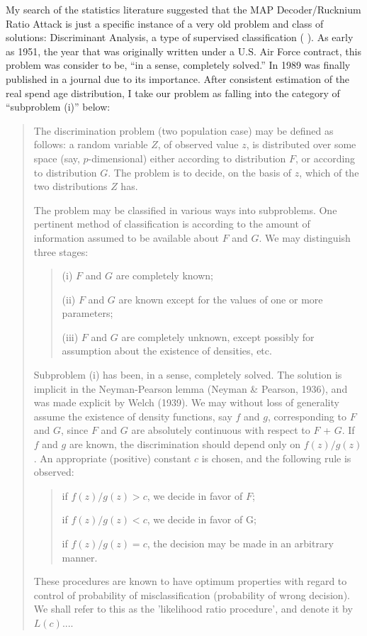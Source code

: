 \documentclass[english]{article}
\begin{document}
My search of the statistics literature suggested that the MAP Decoder/Rucknium
Ratio Attack is just a specific instance of a very old problem and
class of solutions: Discriminant Analysis, a type of supervised classification
(\cite{mclachlan1992discriminant} \cite{FraleyRaftery2002}). As
early as 1951, the year that \cite{FixHodges1989} was originally
written under a U.S. Air Force contract, this problem was consider
to be, ``in a sense, completely solved.'' In 1989 \cite{FixHodges1989}
was finally published in a journal due to its importance. After consistent
estimation of the real spend age distribution, I take our problem
as falling into the category of ``subproblem (i)'' below:
\begin{quote}
The discrimination problem (two population case) may be defined as
follows: a random variable $Z$, of observed value $z$, is distributed
over some space (say, $p$-dimensional) either according to distribution
$F$, or according to distribution $G$. The problem is to decide,
on the basis of $z$, which of the two distributions $Z$ has.

The problem may be classified in various ways into subproblems. One
pertinent method of classification is according to the amount of information
assumed to be available about $F$ and $G$. We may distinguish three
stages:
\begin{quote}
(i) $F$ and $G$ are completely known;

(ii) $F$ and $G$ are known except for the values of one or more
parameters;

(iii) $F$ and $G$ are completely unknown, except possibly for assumption
about the existence of densities, etc.
\end{quote}
Subproblem (i) has been, in a sense, completely solved. The solution
is implicit in the Neyman-Pearson lemma (Neyman \& Pearson, 1936),
and was made explicit by Welch (1939). We may without loss of generality
assume the existence of density functions, say $f$ and $g$, corresponding
to $F$ and $G$, since $F$ and $G$ are absolutely continuous with
respect to $F$ + $G$. If $f$ and $g$ are known, the discrimination
should depend only on $f(z)/g(z)$. An appropriate (positive) constant
$c$ is chosen, and the following rule is observed:
\begin{quote}
if $f(z)/g(z)>c$, we decide in favor of $F$;

if $f(z)/g(z)<c$, we decide in favor of G;

if $f(z)/g(z)=c$, the decision may be made in an arbitrary manner.
\end{quote}
These procedures are known to have optimum properties with regard
to control of probability of misclassification (probability of wrong
decision). We shall refer to this as the 'likelihood ratio procedure',
and denote it by $L(c)$....


\end{quote}
\end{document}
